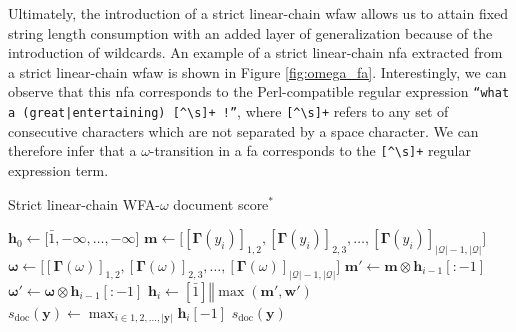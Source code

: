Ultimately, the introduction of a strict linear-chain \ac{wfaw} allows us to
attain fixed string length consumption with an added layer of generalization
because of the introduction of wildcards. An example of a strict linear-chain
\ac{nfa} extracted from a strict linear-chain \ac{wfaw} is shown in Figure
\ref{fig:omega_fa}. Interestingly, we can observe that this \ac{nfa} corresponds to
the Perl-compatible regular expression \texttt{``what a (great|entertaining)
  [\^{}\textbackslash s]+ !''}, where
\texttt{[\^{}\textbackslash s]+} refers to any set of consecutive
characters which are not separated by a space character. We can therefore infer
that a $\omega$-transition in a \ac{fa} corresponds to the
\texttt{[\^{}\textbackslash s]+} regular expression term.

\begin{algorithm}[t!]
  \small
  \caption{Strict linear-chain WFA-$\omega$ document score$^*$}
  \label{algo:lc_wfa_w_document_score}
  \begin{algorithmic}[1]
    \Statex
    \State $\bm{h}_0 \gets \big[\bar{1}, -\infty, \ldots, -\infty\big]$ 
     
    \State $\bm{m} \gets \big[[\bm{\Gamma}(y_i)]_{1,2}, [\bm{\Gamma}(y_i)]_{2,3}, \ldots,
    [\bm{\Gamma}(y_i)]_{|\mathcal{Q}|-1,|\mathcal{Q}|}\big]$ 
    \State $\bm{\omega} \gets \big[[\bm{\Gamma}(\omega)]_{1,2}, [\bm{\Gamma}(\omega)]_{2,3}, \ldots,
    [\bm{\Gamma}(\omega)]_{|\mathcal{Q}|-1,|\mathcal{Q}|}\big]$
    \State $\bm{m'} \gets \bm{m} \otimes \bm{h}_{i-1}[:-1]$ 
    \State $\bm{\omega'} \gets \bm{\omega} \otimes \bm{h}_{i-1}[:-1]$ 
    \State $\bm{h}_{i} \gets [\bar{1}] \mathbin\Vert \max(\bm{m'}, \bm{w'})$
    \EndFor
    \State $s_{\text{doc}}(\bm{y}) \gets  \max_{i \in 1,2,...,|\bm{y}|}
    \bm{h}_{i}[-1]$
    \State \Return $s_{\text{doc}}(\bm{y})$
    \EndFunction
  \end{algorithmic}
\end{algorithm}

